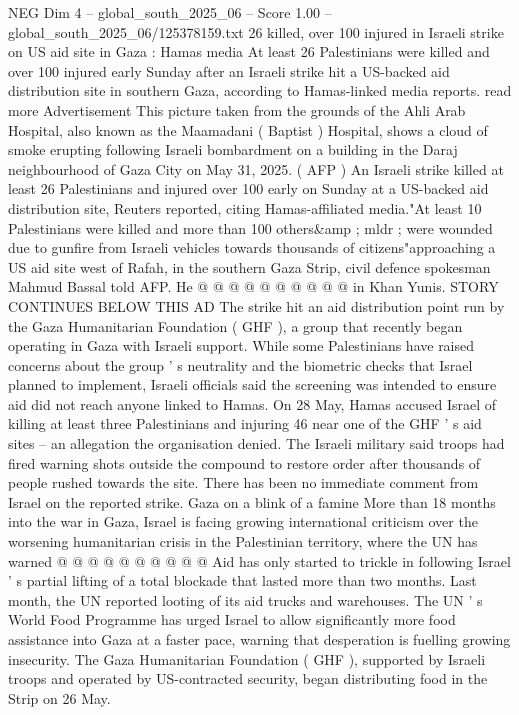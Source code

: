 \begin{textsample}{NEG Dim 4 – global\_south\_2025\_06 – Score 1.00 – global\_south\_2025\_06/125378159.txt}  \label{ex:f4_neg_109}
26 killed, over 100 injured in Israeli strike on US aid site in Gaza : Hamas media At least 26 Palestinians were killed and over 100 injured early Sunday after an Israeli strike hit a US-backed aid distribution site in southern Gaza, according to Hamas-linked media reports. read more Advertisement This picture taken from the grounds of the Ahli Arab Hospital, also known as the Maamadani ( Baptist ) Hospital, shows a cloud of smoke erupting following Israeli bombardment on a building in the Daraj neighbourhood of Gaza City on May 31, 2025. ( AFP ) An Israeli strike killed at least 26 Palestinians and injured over 100 early on Sunday at a US-backed aid distribution site, Reuters reported, citing Hamas-affiliated media."At least 10 Palestinians were killed and more than 100 others\&amp ; mldr ; were wounded due to gunfire from Israeli vehicles towards thousands of citizens"approaching a US aid site west of Rafah, in the southern Gaza Strip, civil defence spokesman Mahmud Bassal told AFP.
He @ @ @ @ @ @ @ @ @ @ in Khan Yunis.
STORY CONTINUES BELOW THIS AD The strike hit an aid distribution point run by the Gaza Humanitarian Foundation ( GHF ), a group that recently began operating in Gaza with Israeli support.
While some Palestinians have raised concerns about the group ' s neutrality and the biometric checks that Israel planned to implement, Israeli officials said the screening was intended to ensure aid did not reach anyone linked to Hamas.
On 28 May, Hamas accused Israel of killing at least three Palestinians and injuring 46 near one of the GHF ' s aid sites -- an allegation the organisation denied.
The Israeli military said troops had fired warning shots outside the compound to restore order after thousands of people rushed towards the site.
There has been no immediate comment from Israel on the reported strike.
Gaza on a blink of a famine More than 18 months into the war in Gaza, Israel is facing growing international criticism over the worsening humanitarian crisis in the Palestinian territory, where the UN has warned @ @ @ @ @ @ @ @ @ @ Aid has only started to trickle in following Israel ' s partial lifting of a total blockade that lasted more than two months.
Last month, the UN reported looting of its aid trucks and warehouses.
The UN ' s World Food Programme has urged Israel to allow significantly more food assistance into Gaza at a faster pace, warning that desperation is fuelling growing insecurity.
The Gaza Humanitarian Foundation ( GHF ), supported by Israeli troops and operated by US-contracted security, began distributing food in the Strip on 26 May.

\end{textsample}

